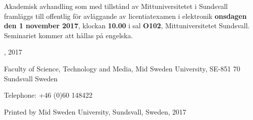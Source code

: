 \thispagestyle{empty}

{\raggedright
Akademisk avhandling som med tillstånd av Mittuniversitetet i Sundsvall framläggs till offentlig för avläggande av licentiatexamen i elektronik \textbf{onsdagen den 1 november 2017}, klockan \textbf{10.00} i sal \textbf{O102}, Mittuniversitetet Sundsvall. Seminariet kommer att hållas på engelska.

\vfill

{\large\thetitle}

\vspace{1cm}

\theauthor

\vspace{1cm}

\textcopyright  \theauthor, 2017
\vspace{1cm}

Faculty of Science, Technology and Media,
Mid Sweden University, SE-851 70 Sundsvall
Sweden

\vspace{1cm}

Telephone: +46 (0)60 148422

\vspace{1cm}

Printed by Mid Sweden University, Sundsvall, Sweden, 2017
}